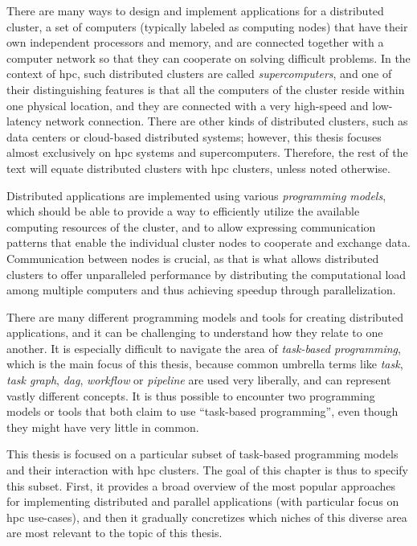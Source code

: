 There are many ways to design and implement applications for a distributed cluster, a set of
computers (typically labeled as computing nodes) that have their own independent processors and
memory, and are connected together with a computer network so that they can cooperate on solving
difficult problems. In the context of \gls{hpc}, such distributed clusters are called
\emph{supercomputers}, and one of their distinguishing features is that all the computers of the
cluster reside within one physical location, and they are connected with a very high-speed and
low-latency network connection. There are other kinds of distributed clusters, such as data centers
or cloud-based distributed systems; however, this thesis focuses almost exclusively on
\gls{hpc} systems and supercomputers. Therefore, the rest of the text will equate
distributed clusters with \gls{hpc} clusters, unless noted otherwise.

Distributed applications are implemented using various \emph{programming models}, which should be able
to provide a way to efficiently utilize the available computing resources of the cluster, and to
allow expressing communication patterns that enable the individual cluster nodes to cooperate and
exchange data. Communication between nodes is crucial, as that is what allows distributed clusters
to offer unparalleled performance by distributing the computational load among multiple computers
and thus achieving speedup through parallelization.

There are many different programming models and tools for creating distributed applications, and it
can be challenging to understand how they relate to one another. It is especially difficult to
navigate the area of \emph{task-based programming}, which is the main focus of this thesis, because common
umbrella terms like \emph{task}, \emph{task graph}, \emph{\gls{dag}},
\emph{workflow} or \emph{pipeline} are used very liberally, and can represent vastly
different concepts. It is thus possible to encounter two programming models or tools that both
claim to use ``task-based programming'', even though they might have very little in common.

This thesis is focused on a particular subset of task-based programming models and their
interaction with \gls{hpc} clusters. The goal of this chapter is thus to specify this
subset. First, it provides a broad overview of the most popular approaches for implementing
distributed and parallel applications (with particular focus on \gls{hpc} use-cases),
and then it gradually concretizes which niches of this diverse area are most relevant to the topic
of this thesis.

